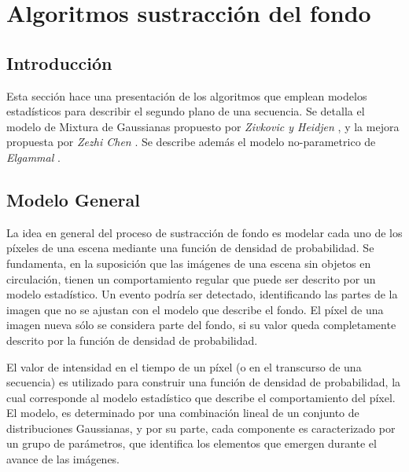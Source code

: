 \chapter{Algoritmos sustracción del fondo}

\section{Introducción}


Esta sección hace una presentación de los algoritmos que emplean modelos estadísticos para describir el segundo plano de una secuencia. Se detalla el modelo de Mixtura de Gaussianas propuesto por \textit{Zivkovic y Heidjen} \cite{zivkovic_efficient_2006}, y la mejora propuesta por \textit{Zezhi Chen} \cite{chen_vehicle_2012}. Se describe además el modelo no-parametrico de \textit{Elgammal} \cite{elgammal_nonparametricmodel_2000}.




\section{Modelo General}

La idea en general del proceso de sustracción de fondo es modelar cada uno de los píxeles de una escena mediante una función de densidad de probabilidad. Se fundamenta, en la suposición que las imágenes de una escena sin objetos en circulación, tienen un comportamiento regular que puede ser descrito por un modelo estadístico. Un evento podría ser detectado, identificando las partes de la imagen que no se ajustan con el modelo que describe el fondo. El píxel de una imagen nueva sólo se considera parte del fondo, si su valor queda completamente descrito por la función de densidad de probabilidad. 


El valor de intensidad en el tiempo de un píxel (o en el transcurso de una secuencia) es utilizado para construir una función de densidad de probabilidad, la cual corresponde al modelo estadístico que describe el comportamiento del píxel. El modelo, es determinado por una combinación lineal de un conjunto de distribuciones Gaussianas, y por su parte, cada componente es caracterizado por un grupo de parámetros, que identifica los elementos que emergen durante el avance de las imágenes.

